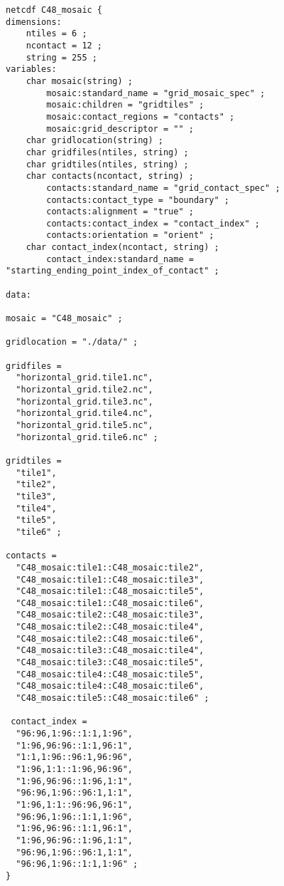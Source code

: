 \begin{verbatim}
netcdf C48_mosaic {
dimensions:
	ntiles = 6 ;
	ncontact = 12 ;
	string = 255 ;
variables:
	char mosaic(string) ;
		mosaic:standard_name = "grid_mosaic_spec" ;
		mosaic:children = "gridtiles" ;
		mosaic:contact_regions = "contacts" ;
		mosaic:grid_descriptor = "" ;
	char gridlocation(string) ;
	char gridfiles(ntiles, string) ;
	char gridtiles(ntiles, string) ;
	char contacts(ncontact, string) ;
		contacts:standard_name = "grid_contact_spec" ;
		contacts:contact_type = "boundary" ;
		contacts:alignment = "true" ;
		contacts:contact_index = "contact_index" ;
		contacts:orientation = "orient" ;
	char contact_index(ncontact, string) ;
		contact_index:standard_name = "starting_ending_point_index_of_contact" ;

data:

mosaic = "C48_mosaic" ;

gridlocation = "./data/" ;

gridfiles =
  "horizontal_grid.tile1.nc",
  "horizontal_grid.tile2.nc",
  "horizontal_grid.tile3.nc",
  "horizontal_grid.tile4.nc",
  "horizontal_grid.tile5.nc",
  "horizontal_grid.tile6.nc" ;

gridtiles =
  "tile1",
  "tile2",
  "tile3",
  "tile4",
  "tile5",
  "tile6" ;

contacts =
  "C48_mosaic:tile1::C48_mosaic:tile2",
  "C48_mosaic:tile1::C48_mosaic:tile3",
  "C48_mosaic:tile1::C48_mosaic:tile5",
  "C48_mosaic:tile1::C48_mosaic:tile6",
  "C48_mosaic:tile2::C48_mosaic:tile3",
  "C48_mosaic:tile2::C48_mosaic:tile4",
  "C48_mosaic:tile2::C48_mosaic:tile6",
  "C48_mosaic:tile3::C48_mosaic:tile4",
  "C48_mosaic:tile3::C48_mosaic:tile5",
  "C48_mosaic:tile4::C48_mosaic:tile5",
  "C48_mosaic:tile4::C48_mosaic:tile6",
  "C48_mosaic:tile5::C48_mosaic:tile6" ;

 contact_index =
  "96:96,1:96::1:1,1:96",
  "1:96,96:96::1:1,96:1",
  "1:1,1:96::96:1,96:96",
  "1:96,1:1::1:96,96:96",
  "1:96,96:96::1:96,1:1",
  "96:96,1:96::96:1,1:1",
  "1:96,1:1::96:96,96:1",
  "96:96,1:96::1:1,1:96",
  "1:96,96:96::1:1,96:1",
  "1:96,96:96::1:96,1:1",
  "96:96,1:96::96:1,1:1",
  "96:96,1:96::1:1,1:96" ;
}
\end{verbatim}
 
